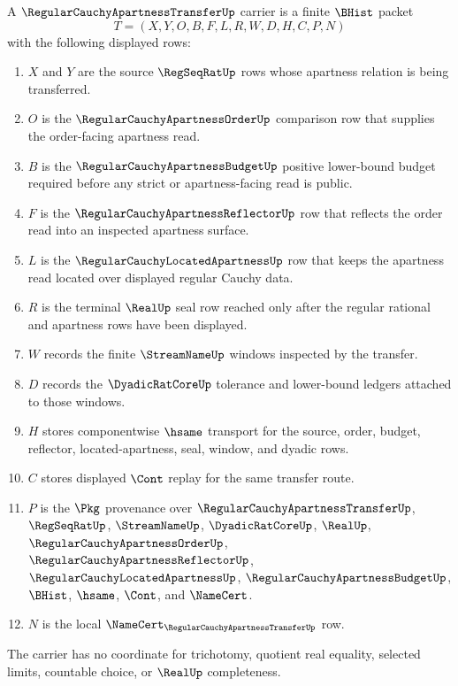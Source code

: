 \begin{definition}
\label{def:regular-cauchy-apartness-transfer-carrier}
A $\RegularCauchyApartnessTransferUp$ carrier is a finite $\BHist$ packet
$$
T=(X,Y,O,B,F,L,R,W,D,H,C,P,N)
$$
with the following displayed rows:
\begin{enumerate}
\item $X$ and $Y$ are the source $\RegSeqRatUp$ rows whose apartness relation is being transferred.
\item $O$ is the $\RegularCauchyApartnessOrderUp$ comparison row that supplies the order-facing apartness read.
\item $B$ is the $\RegularCauchyApartnessBudgetUp$ positive lower-bound budget required before any strict or apartness-facing read is public.
\item $F$ is the $\RegularCauchyApartnessReflectorUp$ row that reflects the order read into an inspected apartness surface.
\item $L$ is the $\RegularCauchyLocatedApartnessUp$ row that keeps the apartness read located over displayed regular Cauchy data.
\item $R$ is the terminal $\RealUp$ seal row reached only after the regular rational and apartness rows have been displayed.
\item $W$ records the finite $\StreamNameUp$ windows inspected by the transfer.
\item $D$ records the $\DyadicRatCoreUp$ tolerance and lower-bound ledgers attached to those windows.
\item $H$ stores componentwise $\hsame$ transport for the source, order, budget, reflector, located-apartness, seal, window, and dyadic rows.
\item $C$ stores displayed $\Cont$ replay for the same transfer route.
\item $P$ is the $\Pkg$ provenance over $\RegularCauchyApartnessTransferUp$, $\RegSeqRatUp$, $\StreamNameUp$, $\DyadicRatCoreUp$, $\RealUp$, $\RegularCauchyApartnessOrderUp$, $\RegularCauchyApartnessReflectorUp$, $\RegularCauchyLocatedApartnessUp$, $\RegularCauchyApartnessBudgetUp$, $\BHist$, $\hsame$, $\Cont$, and $\NameCert$.
\item $N$ is the local $\NameCert_{\RegularCauchyApartnessTransferUp}$ row.
\end{enumerate}
The carrier has no coordinate for trichotomy, quotient real equality, selected limits, countable choice, or $\RealUp$ completeness.
\end{definition}

